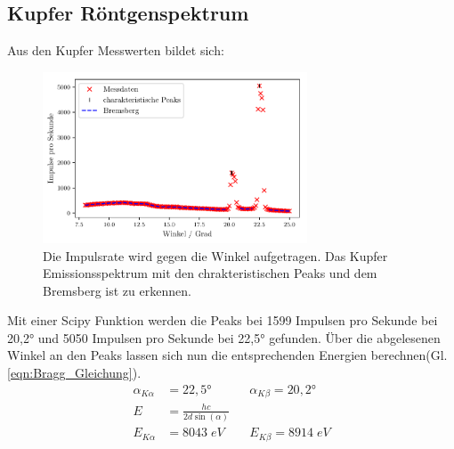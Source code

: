 \subsection{Kupfer Röntgenspektrum}
Aus den Kupfer Messwerten bildet sich:
\begin{figure}[H]
    \centering
    \includegraphics[width=0.7\textwidth]{plots/CU_Spektrum.pdf}
    \caption{Die Impulsrate wird gegen die Winkel aufgetragen. Das Kupfer Emissionsspektrum mit den chrakteristischen Peaks und dem Bremsberg ist zu erkennen.  }
    \label{fig:CU_Spektrum}
\end{figure}
Mit einer Scipy Funktion werden die Peaks bei 1599 Impulsen pro Sekunde bei 20,2° und 5050 Impulsen pro Sekunde bei 22,5° gefunden.
Über die abgelesenen Winkel an den Peaks lassen sich nun die entsprechenden Energien berechnen(Gl. \ref{eqn:Bragg_Gleichung}).
\begin{align*}
    \alpha_{K\alpha} &= 22,5° &&   \alpha_{K\beta} = 20,2° \\
    E &= \frac{hc}{2d\sin(\alpha)} \\
    E_{K\alpha} &= 8043 \; eV && E_{K\beta} = 8914\; eV \label{eqn:Energien_Spektrum}
\end{align*}

